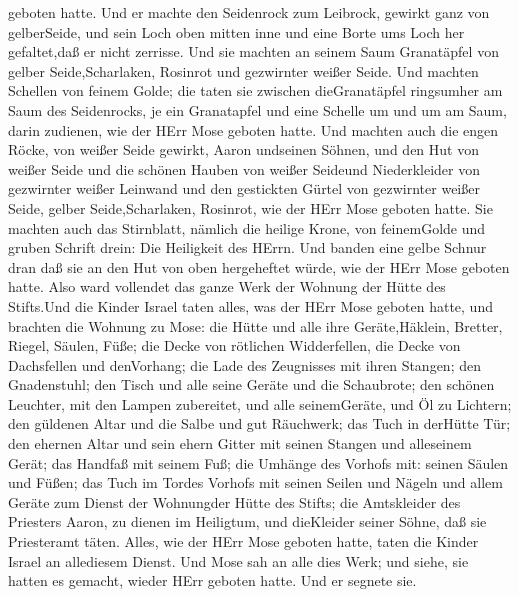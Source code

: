 geboten hatte.  Und er machte den Seidenrock zum Leibrock,
gewirkt ganz von gelberSeide,  und sein Loch oben mitten
inne und eine Borte ums Loch her gefaltet,daß er nicht zerrisse.
 Und sie machten an seinem Saum Granatäpfel von gelber
Seide,Scharlaken, Rosinrot und gezwirnter weißer Seide. 
Und machten Schellen von feinem Golde; die taten sie zwischen
dieGranatäpfel ringsumher am Saum des Seidenrocks,  je ein
Granatapfel und eine Schelle um und um am Saum, darin zudienen, wie der
HErr Mose geboten hatte.  Und machten auch die engen Röcke,
von weißer Seide gewirkt, Aaron undseinen Söhnen,  und den
Hut von weißer Seide und die schönen Hauben von weißer Seideund
Niederkleider von gezwirnter weißer Leinwand  und den
gestickten Gürtel von gezwirnter weißer Seide, gelber Seide,Scharlaken,
Rosinrot, wie der HErr Mose geboten hatte.  Sie machten
auch das Stirnblatt, nämlich die heilige Krone, von feinemGolde und
gruben Schrift drein: Die Heiligkeit des HErrn.  Und banden
eine gelbe Schnur dran daß sie an den Hut von oben hergeheftet würde,
wie der HErr Mose geboten hatte.  Also ward vollendet das
ganze Werk der Wohnung der Hütte des Stifts.Und die Kinder Israel taten
alles, was der HErr Mose geboten hatte,  und brachten die
Wohnung zu Mose: die Hütte und alle ihre Geräte,Häklein, Bretter,
Riegel, Säulen, Füße;  die Decke von rötlichen
Widderfellen, die Decke von Dachsfellen und denVorhang; 
die Lade des Zeugnisses mit ihren Stangen; den Gnadenstuhl;
 den Tisch und alle seine Geräte und die Schaubrote;
 den schönen Leuchter, mit den Lampen zubereitet, und alle
seinemGeräte, und Öl zu Lichtern;  den güldenen Altar und
die Salbe und gut Räuchwerk; das Tuch in derHütte Tür;  den
ehernen Altar und sein ehern Gitter mit seinen Stangen und alleseinem
Gerät; das Handfaß mit seinem Fuß;  die Umhänge des Vorhofs
mit: seinen Säulen und Füßen; das Tuch im Tordes Vorhofs mit seinen
Seilen und Nägeln und allem Geräte zum Dienst der Wohnungder Hütte des
Stifts;  die Amtskleider des Priesters Aaron, zu dienen im
Heiligtum, und dieKleider seiner Söhne, daß sie Priesteramt täten.
 Alles, wie der HErr Mose geboten hatte, taten die Kinder
Israel an allediesem Dienst.  Und Mose sah an alle dies
Werk; und siehe, sie hatten es gemacht, wieder HErr geboten hatte. Und
er segnete sie.

